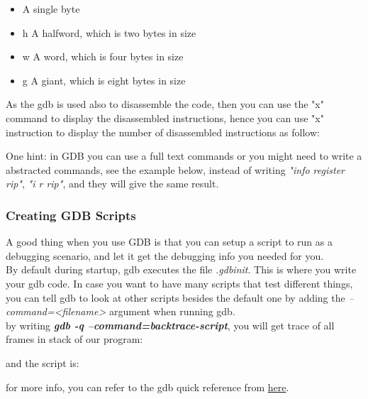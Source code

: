 \documentclass{article}
\begin{document}
\begin{enumerate}
    \begin{itemize}
        \item A single byte
        \item h A halfword, which is two bytes in size
        \item w A word, which is four bytes in size
        \item g A giant, which is eight bytes in size
    \end{itemize}

    As the gdb is used also to disassemble the code, then you can use the "x" command to display the disassembled instructions, hence you can use "x" instruction to display the number of disassembled instructions as follow:
    
    
    One hint: in GDB you can use a full text commands or you might need to write a abstracted commands, see the example below, instead of writing \textit{"info register rip"}, \textit{"i r rip"}, and they will give the same result. 
    


\end{enumerate}

\subsubsection{Creating GDB Scripts}
A good thing when you use GDB is that you can setup a script to run as a debugging scenario, and let it get the debugging info you needed for you.\\

By default during startup, gdb executes the file \textit{.gdbinit}. This is where you write your gdb code. In case you want to have many scripts that test different things, you can tell gdb to look at other scripts besides the default one by adding the \textit{--command=<filename>} argument when running gdb.\\

by writing \textit{\textbf{gdb -q --command=backtrace-script}}, you will get trace of all frames in stack of our program:


and the script is:


for more info, you can refer to the gdb quick reference from \href{http://users.ece.utexas.edu/~adnan/gdb-refcard.pdf}{here}.
\end{document}
